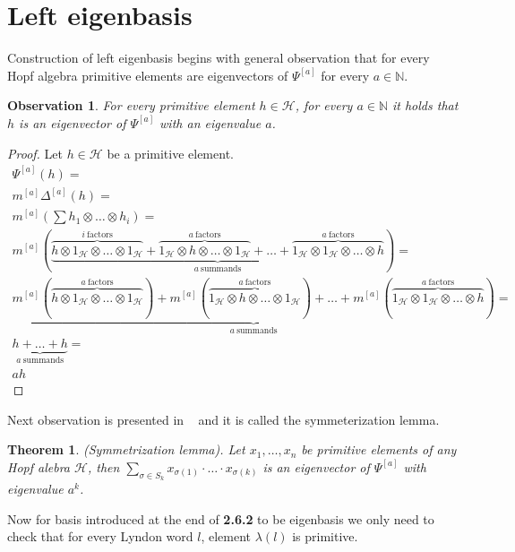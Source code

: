 \documentclass[a4paper, 12pt]{report}
\newtheorem{observation}{Observation}
\newtheorem{theorem}{Theorem}
\begin{document}
\section{Left eigenbasis}
Construction of left eigenbasis begins with general observation that for every Hopf algebra
primitive elements are eigenvectors of $\Psi^{[a]}$ for every $a \in \mathbb{N}$.
\begin{observation}
For every primitive element $h \in \mathcal{H}$, for every $a \in \mathbb{N}$ it holds that $h$ is an
eigenvector of $\Psi^{[a]}$ with an eigenvalue $a$.
\end{observation}
\begin{proof}
Let $h \in \mathcal{H}$ be a primitive element.
\begin{gather*}
\Psi^{[a]}(h) = \\ m^{[a]}\Delta^{[a]}(h) = \\
m^{[a]}(\sum h_1 \otimes \dots \otimes h_i) = \\
m^{[a]}(\underbrace{\overbrace{h \otimes 1_\mathcal{H} \otimes \dots \otimes 1_\mathcal{H}}^{i\
\mathrm{factors}} +
\overbrace{1_\mathcal{H} \otimes h \otimes \dots \otimes 1_\mathcal{H}}^{a\ \mathrm{factors}} +
\dots +
\overbrace{1_\mathcal{H} \otimes 1_\mathcal{H} \otimes \dots \otimes h}^{a\ \mathrm{factors}}}_{a\
\mathrm{summands}} ) = \\
\underbrace{m^{[a]}(\overbrace{h \otimes 1_\mathcal{H} \otimes \dots \otimes 1_\mathcal{H}}^{a\
\mathrm{factors}}) +
m^{[a]}(\overbrace{1_\mathcal{H} \otimes h \otimes \dots \otimes 1_\mathcal{H}}^{a\ \mathrm{factors}}) +
\dots +
m^{[a]}(\overbrace{1_\mathcal{H} \otimes 1_\mathcal{H} \otimes \dots \otimes h}^{a\ \mathrm{factors}})}_{a\
\mathrm{summands}} = \\
\underbrace{h + \dots + h}_{a\ \mathrm{summands}} = \\
ah
\end{gather*}

\end{proof}
Next observation is presented in ~\cite{Diaconis2014} and it is called the symmeterization lemma.
\begin{theorem}
(Symmetrization lemma). Let $x_1, \dots, x_n$ be primitive elements of any Hopf alebra $\mathcal{H}$, then
$\displaystyle\sum_{\sigma \in S_k} x_{\sigma(1)}\cdot\ldots\cdot x_{\sigma(k)}$ is an eigenvector of
$\Psi^{[a]}$ with eigenvalue $a^k$.
\end{theorem}

Now for basis introduced at the end of \textbf{2.6.2} to be eigenbasis we only need to check that for
every Lyndon
word $l$, element $\lambda(l)$ is primitive.
\end{document}
